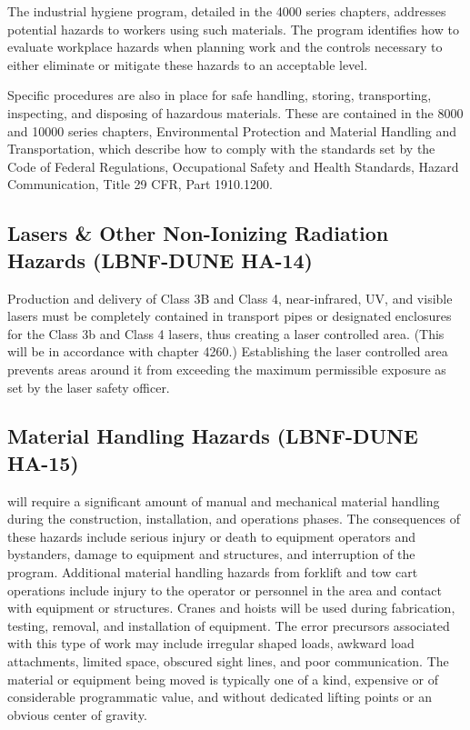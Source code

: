 The industrial hygiene program, detailed in the  4000
series chapters, addresses potential hazards to workers using such
materials. The program identifies how to evaluate workplace hazards
when planning work and the controls necessary to either eliminate or
mitigate these hazards to an acceptable level.

Specific procedures are also in place for safe handling, storing,
transporting, inspecting, and disposing of hazardous materials. These
are contained in the  8000 and 10000 series chapters,
Environmental Protection and Material Handling and Transportation,
which describe how to comply with the standards set by the Code of
Federal Regulations, Occupational Safety and Health Standards, Hazard
Communication, Title 29 CFR, Part 1910.1200.


\subsection{Lasers \& Other Non-Ionizing Radiation Hazards (LBNF-DUNE HA-14)}
\label{sec:tc-esh-lasers}

Production and delivery of Class 3B and Class 4, near-infrared, UV,
and visible lasers must be completely contained in transport pipes or
designated enclosures for the Class 3b and Class 4 lasers, thus
creating a laser controlled area. (This will be in accordance with
\fnal {} chapter 4260.)  Establishing the laser controlled
area prevents areas around it from exceeding the maximum permissible
exposure as set by the \fnal laser safety officer.

\subsection{Material Handling Hazards (LBNF-DUNE HA-15)}

 will require a significant amount of manual and mechanical
material handling during the construction, installation, and operations
phases.  The consequences of these hazards include serious injury or
death to equipment operators and bystanders, damage to equipment and
structures, and interruption of the program.  Additional material
handling hazards from forklift and tow cart operations include injury
to the operator or personnel in the area and contact with equipment or
structures. Cranes and hoists will be used during fabrication,
testing, removal, and installation of equipment. The error precursors
associated with this type of work may include irregular shaped loads,
awkward load attachments, limited space, obscured sight lines, and
poor communication.  The material or equipment being moved is
typically one of a kind, expensive or of considerable programmatic
value, and without dedicated lifting points or an obvious center
of gravity.

